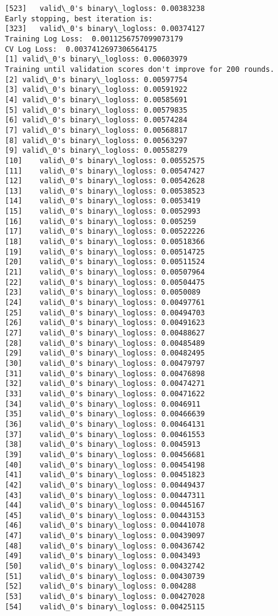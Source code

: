 \documentclass[11pt]{article}
\begin{document}
\begin{Verbatim}[commandchars=\\\{\}]
[523]	valid\_0's binary\_logloss: 0.00383238
Early stopping, best iteration is:
[323]	valid\_0's binary\_logloss: 0.00374127
Training Log Loss:  0.0011256757099073179
CV Log Loss:  0.0037412697306564175
[1]	valid\_0's binary\_logloss: 0.00603979
Training until validation scores don't improve for 200 rounds.
[2]	valid\_0's binary\_logloss: 0.00597754
[3]	valid\_0's binary\_logloss: 0.00591922
[4]	valid\_0's binary\_logloss: 0.00585691
[5]	valid\_0's binary\_logloss: 0.00579835
[6]	valid\_0's binary\_logloss: 0.00574284
[7]	valid\_0's binary\_logloss: 0.00568817
[8]	valid\_0's binary\_logloss: 0.00563297
[9]	valid\_0's binary\_logloss: 0.00558279
[10]	valid\_0's binary\_logloss: 0.00552575
[11]	valid\_0's binary\_logloss: 0.00547427
[12]	valid\_0's binary\_logloss: 0.00542628
[13]	valid\_0's binary\_logloss: 0.00538523
[14]	valid\_0's binary\_logloss: 0.0053419
[15]	valid\_0's binary\_logloss: 0.0052993
[16]	valid\_0's binary\_logloss: 0.005259
[17]	valid\_0's binary\_logloss: 0.00522226
[18]	valid\_0's binary\_logloss: 0.00518366
[19]	valid\_0's binary\_logloss: 0.00514725
[20]	valid\_0's binary\_logloss: 0.00511524
[21]	valid\_0's binary\_logloss: 0.00507964
[22]	valid\_0's binary\_logloss: 0.00504475
[23]	valid\_0's binary\_logloss: 0.0050089
[24]	valid\_0's binary\_logloss: 0.00497761
[25]	valid\_0's binary\_logloss: 0.00494703
[26]	valid\_0's binary\_logloss: 0.00491623
[27]	valid\_0's binary\_logloss: 0.00488627
[28]	valid\_0's binary\_logloss: 0.00485489
[29]	valid\_0's binary\_logloss: 0.00482495
[30]	valid\_0's binary\_logloss: 0.00479797
[31]	valid\_0's binary\_logloss: 0.00476898
[32]	valid\_0's binary\_logloss: 0.00474271
[33]	valid\_0's binary\_logloss: 0.00471622
[34]	valid\_0's binary\_logloss: 0.0046911
[35]	valid\_0's binary\_logloss: 0.00466639
[36]	valid\_0's binary\_logloss: 0.00464131
[37]	valid\_0's binary\_logloss: 0.00461553
[38]	valid\_0's binary\_logloss: 0.0045913
[39]	valid\_0's binary\_logloss: 0.00456681
[40]	valid\_0's binary\_logloss: 0.00454198
[41]	valid\_0's binary\_logloss: 0.00451823
[42]	valid\_0's binary\_logloss: 0.00449437
[43]	valid\_0's binary\_logloss: 0.00447311
[44]	valid\_0's binary\_logloss: 0.00445167
[45]	valid\_0's binary\_logloss: 0.00443153
[46]	valid\_0's binary\_logloss: 0.00441078
[47]	valid\_0's binary\_logloss: 0.00439097
[48]	valid\_0's binary\_logloss: 0.00436742
[49]	valid\_0's binary\_logloss: 0.0043493
[50]	valid\_0's binary\_logloss: 0.00432742
[51]	valid\_0's binary\_logloss: 0.00430739
[52]	valid\_0's binary\_logloss: 0.004288
[53]	valid\_0's binary\_logloss: 0.00427028
[54]	valid\_0's binary\_logloss: 0.00425115

\end{Verbatim}
\end{document}

